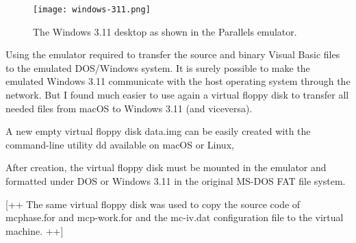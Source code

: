 \begin{figure}[t]
	\centering
	\texttt{[image: windows-311.png]}
	\caption{The Windows 3.11 desktop as shown in the Parallels emulator.}
	\label{fig:windows-311}
\end{figure}



Using the emulator required to transfer the source and binary Visual Basic files to the emulated DOS/Windows system.
It is surely possible to make the emulated Windows 3.11 communicate with the host operating system through the network. But I found much easier to use again a virtual floppy disk to transfer all needed files from macOS to Windows 3.11 (and viceversa).

A new empty virtual floppy disk \textsf{data.img} can be easily created with the command-line utility \textsf{dd} available on macOS or Linux, 



After creation, the virtual floppy disk must be mounted in the emulator and formatted under DOS or Windows 3.11 in the original MS-DOS FAT file system.

[++ The same virtual floppy disk was used to copy the source code of \textsf{mcphase.for} and \textsf{mcp-work.for} and the \textsf{mc-iv.dat} configuration file to the virtual machine. ++]

%

